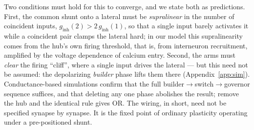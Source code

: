 \documentclass[11pt,a4paper]{article}
\begin{document}
Two conditions must hold for this to converge, and we state both as predictions. First, the common shunt onto a lateral must be \emph{supralinear} in the number of coincident inputs, $g_{\mathrm{inh}}(2)>2\,g_{\mathrm{inh}}(1)$, so that a single input barely activates it while a coincident pair clamps the lateral hard; in our model this supralinearity comes from the hub's own firing threshold, that is, from interneuron recruitment, amplified by the voltage dependence of calcium entry. Second, the arms must \emph{clear} the firing ``cliff'', where a single input drives the lateral --- but this need not be assumed: the depolarizing \emph{builder} phase lifts them there (Appendix~\ref{app:sim}). Conductance-based simulations confirm that the full builder$\to$switch$\to$governor sequence suffices, and that deleting any one phase abolishes the result; remove the hub and the identical rule gives OR. The wiring, in short, need not be specified synapse by synapse. It is the fixed point of ordinary plasticity operating under a pre-positioned shunt.
\end{document}
